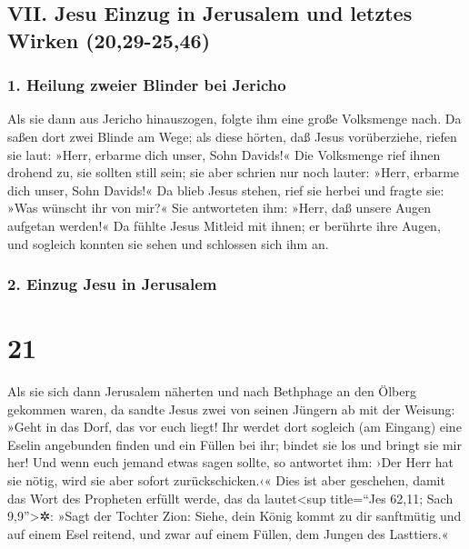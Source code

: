 \hypertarget{vii.-jesu-einzug-in-jerusalem-und-letztes-wirken-2029-2546}{%
\subsection{VII. Jesu Einzug in Jerusalem und letztes Wirken
(20,29-25,46)}\label{vii.-jesu-einzug-in-jerusalem-und-letztes-wirken-2029-2546}}

\hypertarget{heilung-zweier-blinder-bei-jericho}{%
\subsubsection{1. Heilung zweier Blinder bei
Jericho}\label{heilung-zweier-blinder-bei-jericho}}

 Als sie dann aus Jericho hinauszogen, folgte ihm eine
große Volksmenge nach.  Da saßen dort zwei Blinde am
Wege; als diese hörten, daß Jesus vorüberziehe, riefen sie laut: »Herr,
erbarme dich unser, Sohn Davids!«  Die Volksmenge rief
ihnen drohend zu, sie sollten still sein; sie aber schrien nur noch
lauter: »Herr, erbarme dich unser, Sohn Davids!«  Da
blieb Jesus stehen, rief sie herbei und fragte sie: »Was wünscht ihr von
mir?«  Sie antworteten ihm: »Herr, daß unsere Augen
aufgetan werden!«  Da fühlte Jesus Mitleid mit ihnen; er
berührte ihre Augen, und sogleich konnten sie sehen und schlossen sich
ihm an.

\hypertarget{einzug-jesu-in-jerusalem}{%
\subsubsection{2. Einzug Jesu in
Jerusalem}\label{einzug-jesu-in-jerusalem}}

\hypertarget{section-20}{%
\section{21}\label{section-20}}

 Als sie sich dann Jerusalem näherten und nach Bethphage
an den Ölberg gekommen waren, da sandte Jesus zwei von seinen Jüngern ab
 mit der Weisung: »Geht in das Dorf, das vor euch liegt!
Ihr werdet dort sogleich (am Eingang) eine Eselin angebunden finden und
ein Füllen bei ihr; bindet sie los und bringt sie mir her!
 Und wenn euch jemand etwas sagen sollte, so antwortet
ihm: ›Der Herr hat sie nötig, wird sie aber sofort zurückschicken.‹«
 Dies ist aber geschehen, damit das Wort des Propheten
erfüllt werde, das da lautet\textless sup title=``Jes 62,11; Sach
9,9''\textgreater✲:  »Sagt der Tochter Zion: Siehe, dein
König kommt zu dir sanftmütig und auf einem Esel reitend, und zwar auf
einem Füllen, dem Jungen des Lasttiers.«

